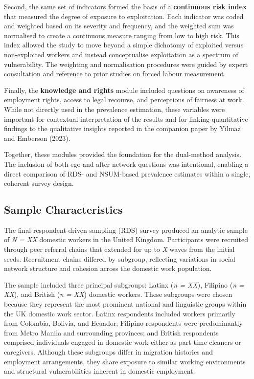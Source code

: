\documentclass[
  12pt,
  letterpaper,
  DIV=11,
  numbers=noendperiod]{scrartcl}
\theoremstyle{plain}
\theoremstyle{definition}
\begin{document}
Second, the same set of indicators formed the basis of a
\textbf{continuous risk index} that measured the degree of exposure to
exploitation. Each indicator was coded and weighted based on its
severity and frequency, and the weighted sum was normalised to create a
continuous measure ranging from low to high risk. This index allowed the
study to move beyond a simple dichotomy of exploited versus
non-exploited workers and instead conceptualise exploitation as a
spectrum of vulnerability. The weighting and normalisation procedures
were guided by expert consultation and reference to prior studies on
forced labour measurement.

Finally, the \textbf{knowledge and rights} module included questions on
awareness of employment rights, access to legal recourse, and
perceptions of fairness at work. While not directly used in the
prevalence estimation, these variables were important for contextual
interpretation of the results and for linking quantitative findings to
the qualitative insights reported in the companion paper by Yilmaz and
Emberson (2023).

Together, these modules provided the foundation for the dual-method
analysis. The inclusion of both ego and alter network questions was
intentional, enabling a direct comparison of RDS- and NSUM-based
prevalence estimates within a single, coherent survey design.

\subsection{Sample Characteristics}\label{sample-characteristics}

The final respondent-driven sampling (RDS) survey produced an analytic
sample of \emph{N = XX} domestic workers in the United Kingdom.
Participants were recruited through peer referral chains that extended
for up to \emph{X} waves from the initial seeds. Recruitment chains
differed by subgroup, reflecting variations in social network structure
and cohesion across the domestic work population.

The sample included three principal subgroups: Latinx (\emph{n = XX}),
Filipino (\emph{n = XX}), and British (\emph{n = XX}) domestic workers.
These subgroups were chosen because they represent the most prominent
national and linguistic groups within the UK domestic work sector.
Latinx respondents included workers primarily from Colombia, Bolivia,
and Ecuador; Filipino respondents were predominantly from Metro Manila
and surrounding provinces; and British respondents comprised individuals
engaged in domestic work either as part-time cleaners or caregivers.
Although these subgroups differ in migration histories and employment
arrangements, they share exposure to similar working environments and
structural vulnerabilities inherent in domestic employment.
\end{document}
